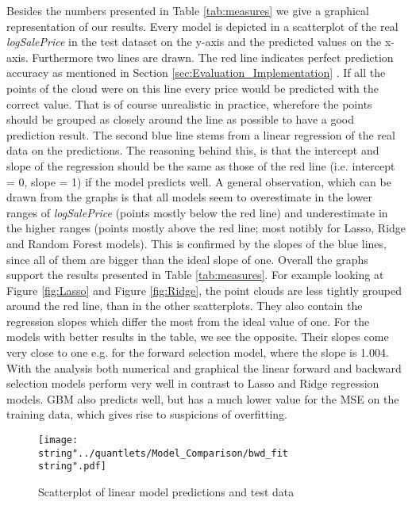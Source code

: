 Besides the numbers presented in Table \ref{tab:measures} we give a graphical representation of our results. Every model is depicted in a scatterplot of the real \textit{logSalePrice} in the test dataset on the y-axis and the predicted values on the x-axis. Furthermore two lines are drawn. The red line indicates perfect prediction accuracy as mentioned in Section \ref{sec:Evaluation_Implementation} . If all the points of the cloud were on this line every price would be predicted with the correct value. That is of course unrealistic in practice, wherefore the points should be grouped as closely around the line as possible to have a good prediction result. The second blue line stems from a linear regression of the real data on the predictions. The reasoning behind this, is that the intercept and slope of the regression should be the same as those of the red line (i.e. intercept = 0, slope = 1) if the model predicts well. A general observation, which can be drawn from the graphs is that all models seem to overestimate in the lower ranges of \textit{logSalePrice} (points mostly below the red line) and underestimate in the higher ranges (points mostly above the red line; most notibly for Lasso, Ridge and Random Forest models). This is confirmed by the slopes of the blue lines, since all of them are bigger than the ideal slope of one. Overall the graphs support the results presented in Table \ref{tab:measures}. For example looking at Figure \ref{fig:Lasso} and Figure \ref{fig:Ridge}, the point clouds are less tightly grouped around the red line, than in the other scatterplots. They also contain the regression slopes  which differ the most from the ideal value of one. For the models with better results in the table, we see the opposite. Their slopes come very close to one e.g. for the forward selection model, where the slope is 1.004. With the analysis both numerical and graphical the linear forward and backward selection models perform very well in contrast to Lasso and Ridge regression models. GBM also predicts well, but has  a much lower value for the MSE on the training data, which gives rise to suspicions of overfitting.  




\begin{figure}[H]
\centering
	\texttt{[image: \\string"../quantlets/Model\_Comparison/bwd\_fit\\string".pdf]}
  	\caption{Scatterplot of linear model predictions and test data}
  	\label{fig:lm}
\end{figure}

